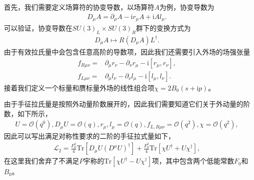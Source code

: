 \documentclass[aps,tightenlines,16pt]{ctexart}
\numberwithin{equation}{section}
\newcommand{\mO}{\mathcal{O}}
\newcommand{\mL}{\mathcal{L}}
\begin{document}
首先，我们需要定义场算符的协变导数，以场算符$A$为例，协变导数为
\begin{align}
   D_{\mu}A=\partial_{\mu}A-\mbox{i}r_{\mu}A+\mbox{i}Al_{\mu}.
\end{align}
可以验证，协变导数在$SU(3)_L\times SU(3)_R$群下的变换方式为
\begin{align}
   D_{\mu}A \mapsto R(D_{\mu}A)L^{\dagger}.
\end{align}
由于有效拉氏量中会包含任意高阶的导数项，因此我们还需要引入外场的场强张量
\begin{align}
   f_{R\mu\nu}=&\partial_{\mu}r_{\nu}-\partial_{\nu}r_{\mu}-\mbox{i}[r_{\mu},r_{\nu}],\\
   f_{L\mu\nu}=&\partial_{\mu}l_{\nu}-\partial_{\nu}l_{\mu}-\mbox{i}[l_{\mu},l_{\nu}].
\end{align}
接着我们定义一个标量和赝标量外场的线性组合项$\chi=2B_0(s+\mbox{i}p)$。

由于手征拉氏量是按照外动量阶数展开的，因此我们需要知道它们关于外动量的阶数，如下所示，
\begin{align}
   U=\mathcal{O}(q^0),D_{\mu}U=\mathcal{O}(q),r_{\mu},l_{\mu}=\mO (q), f_{L,R \mu \nu}=\mO(q^2), \chi = \mO (q^2),
\end{align}
因此可以写出满足对称性要求的二阶的手征拉式量如下\cite{GASSER1985465}，
\begin{align}
   \mL_2 =\frac{F_0^2}{4} \text{Tr}[D_{\mu}U (D^{\mu}U)^{\dagger}] + \frac{F_0^2}{4} \text{Tr}[\chi U^{\dagger} + U \chi^{\dagger}],
\end{align}
在这里我们舍弃了不满足$P$宇称的$\text{Tr}[\chi U^{\dagger}-U\chi^{\dagger}]$项，其中包含两个低能常数$F_0$和$B_0$。
\end{document}
